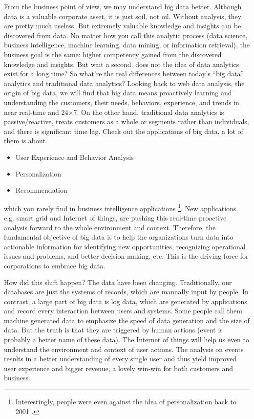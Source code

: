 \documentclass[11pt]{book}
\begin{document}
From the business point of view, we may understand big data better. Although data is a valuable corporate asset, it is just soil, not oil. Without analysis, they are pretty much useless. But extremely valuable knowledge and insights can be discovered from data. No matter how you call this analytic process (data science, business intelligence, machine learning, data mining, or information retrieval), the business goal is the same: higher competency gained from the discovered knowledge and insights. But wait a second. does not the idea of data analytics exist for a long time? So what're the real differences between today's ``big data'' analytics and traditional data analytics? Looking back to web data analysis, the origin of big data, we will find that big data means proactively learning and understanding the customers, their needs, behaviors, experience, and trends in near real-time and 24$\times$7. On the other hand, traditional data analytics is passive/reactive, treats customers as a whole or segments rather than individuals, and there is significant time lag. Check out the applications of big data, a lot of them is about
\begin{itemize}
\item User Experience and Behavior Analysis
\item Personalization
\item Recommendation
\end{itemize}
which you rarely find in business intelligence applications \footnote{Interestingly, people were even against the idea of personalization back to 2001 \cite{NunesKambil2001}.}. New applications, e.g. smart grid and Internet of things, are pushing this real-time proactive analysis forward to the whole environment and context. Therefore, the fundamental objective of big data is to help the organizations turn data into actionable information for identifying new opportunities, recognizing operational issues and problems, and better decision-making, etc. This is the driving force for corporations to embrace big data.

How did this shift happen? The data have been changing. Traditionally, our databases are just the systems of records, which are manually input by people. In contrast, a large part of big data is log data, which are generated by applications and record every interaction between users and systems. Some people call them machine generated data to emphasize the speed of data generation and the size of data. But the truth is that they are triggered by human actions (event is probably a better name of these data). The Internet of things will help us even to understand the environment and context of user actions. The analysis on events results in a better understanding of every single user and thus yield improved user experience and bigger revenue, a lovely win-win for both customers and business.
\end{document}
